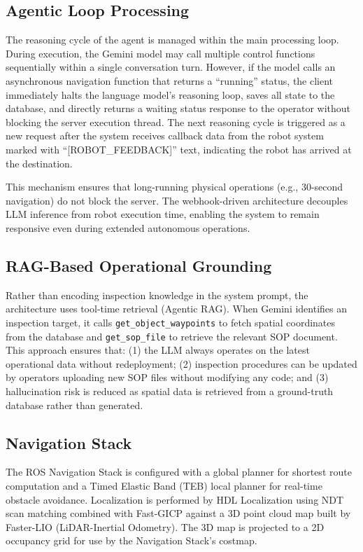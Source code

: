 \documentclass[conference]{IEEEtran}
\begin{document}
\subsection{Agentic Loop Processing}
The reasoning cycle of the agent is managed within the main processing loop. During execution, the Gemini model may call multiple control functions sequentially within a single conversation turn. However, if the model calls an asynchronous navigation function that returns a ``running'' status, the client immediately halts the language model's reasoning loop, saves all state to the database, and directly returns a waiting status response to the operator without blocking the server execution thread. The next reasoning cycle is triggered as a new request after the system receives callback data from the robot system marked with ``[ROBOT\_FEEDBACK]'' text, indicating the robot has arrived at the destination.

This mechanism ensures that long-running physical operations (e.g., 30-second navigation) do not block the server. The webhook-driven architecture decouples LLM inference from robot execution time, enabling the system to remain responsive even during extended autonomous operations.

\subsection{RAG-Based Operational Grounding}
Rather than encoding inspection knowledge in the system prompt, the architecture uses tool-time retrieval (Agentic RAG). When Gemini identifies an inspection target, it calls \texttt{get\_object\_waypoints} to fetch spatial coordinates from the database and \texttt{get\_sop\_file} to retrieve the relevant SOP document. This approach ensures that: (1) the LLM always operates on the latest operational data without redeployment; (2) inspection procedures can be updated by operators uploading new SOP files without modifying any code; and (3) hallucination risk is reduced as spatial data is retrieved from a ground-truth database rather than generated.

\subsection{Navigation Stack}
The ROS Navigation Stack is configured with a global planner for shortest route computation and a Timed Elastic Band (TEB) local planner \cite{rosmann2012trajectory} for real-time obstacle avoidance. Localization is performed by HDL Localization using NDT scan matching \cite{biber2003normal} combined with Fast-GICP \cite{koide2021voxelized} against a 3D point cloud map built by Faster-LIO (LiDAR-Inertial Odometry). The 3D map is projected to a 2D occupancy grid for use by the Navigation Stack's costmap.
\end{document}

